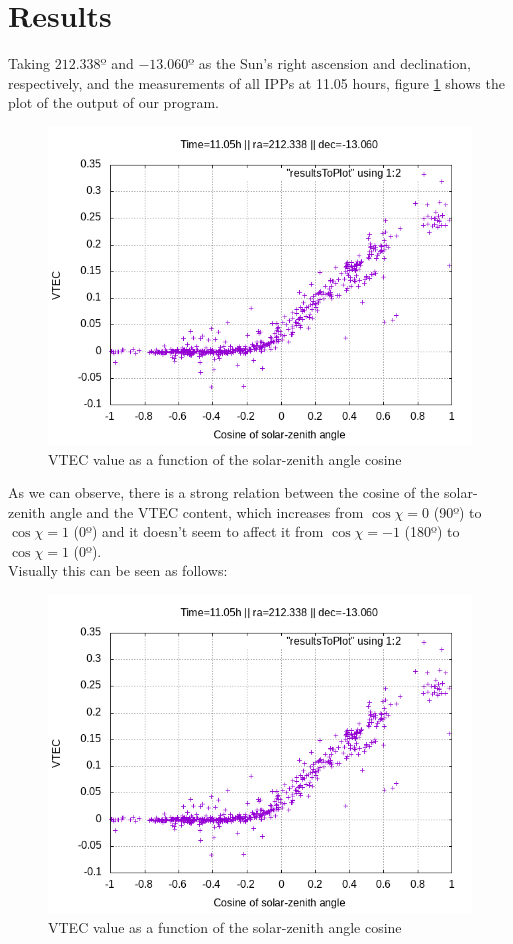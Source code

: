 \section{Results}

Taking $212.338º$ and $-13.060º$ as the Sun's right ascension and declination, respectively, and the measurements of all IPPs at 11.05 hours, figure \ref{fig:results} shows the plot of the output of our program.

\begin{figure}[!htb]
\begin{centering}
	\includegraphics[width=0.5\linewidth]{images/ch4/resultSunTest.png}
	\caption{VTEC value as a function of the solar-zenith angle cosine}
	\label{fig:results}
\end{centering}
\end{figure}

As we can observe, there is a strong relation between the cosine of the solar-zenith angle and the VTEC content, which increases from $\cos\chi = 0$ (90º) to $\cos\chi = 1$ (0º) and it doesn't seem to affect it from $\cos\chi = -1$ (180º) to $\cos\chi = 1$ (0º). \\

Visually this can be seen as follows:

\begin{figure}[!htb]
	\begin{centering}
		\includegraphics[width=0.5\linewidth]{images/ch4/resultSunTest.png}
		\caption{VTEC value as a function of the solar-zenith angle cosine}
		\label{fig:comparison}
	\end{centering}
\end{figure}

